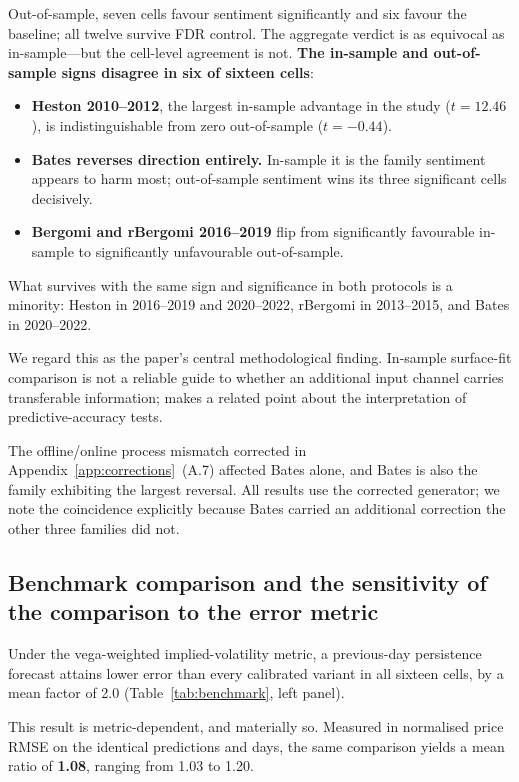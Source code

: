 \documentclass[11pt,a4paper]{article}
\begin{document}
Out-of-sample, seven cells favour sentiment significantly and six favour the
baseline; all twelve survive FDR control. The aggregate verdict is as equivocal
as in-sample---but the cell-level agreement is not. \textbf{The in-sample and
out-of-sample signs disagree in six of sixteen cells}:

\begin{itemize}
\item \textbf{Heston 2010--2012}, the largest in-sample advantage in the study
($t = 12.46$), is indistinguishable from zero out-of-sample ($t = -0.44$).
\item \textbf{Bates reverses direction entirely.} In-sample it is the family
sentiment appears to harm most; out-of-sample sentiment wins its three
significant cells decisively.
\item \textbf{Bergomi and rBergomi 2016--2019} flip from significantly
favourable in-sample to significantly unfavourable out-of-sample.
\end{itemize}

What survives with the same sign and significance in both protocols is a
minority: Heston in 2016--2019 and 2020--2022, rBergomi in 2013--2015, and Bates
in 2020--2022.

We regard this as the paper's central methodological finding. In-sample
surface-fit comparison is not a reliable guide to whether an additional input
channel carries transferable information; \citet{diebold2015} makes a related
point about the interpretation of predictive-accuracy tests.

The offline/online process mismatch corrected in
Appendix~\ref{app:corrections}~(A.7) affected Bates alone, and Bates is also the
family exhibiting the largest reversal. All results use the corrected generator;
we note the coincidence explicitly because Bates carried an additional
correction the other three families did not.

\subsection{Benchmark comparison and the sensitivity of the comparison to the
error metric}
\label{sec:benchmark}

Under the vega-weighted implied-volatility metric, a previous-day persistence
forecast attains lower error than every calibrated variant in all sixteen cells,
by a mean factor of 2.0 (Table~\ref{tab:benchmark}, left panel).

This result is metric-dependent, and materially so. Measured in normalised price
RMSE on the identical predictions and days, the same comparison yields a mean
ratio of \textbf{1.08}, ranging from 1.03 to 1.20.
\end{document}
